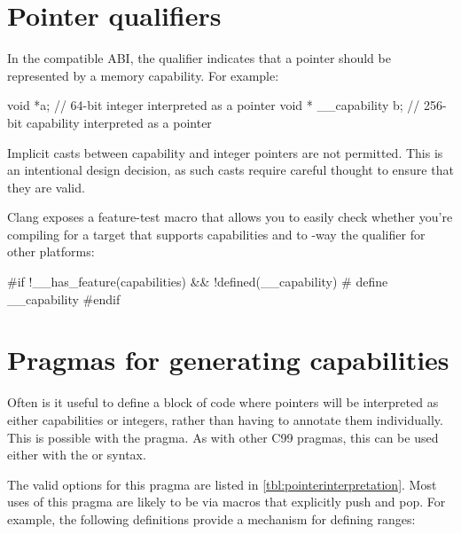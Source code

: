 \section{Pointer qualifiers}

In the compatible ABI, the  qualifier indicates that a pointer should be represented by a memory capability.
For example:

\begin{csnippet}
void *a; // 64-bit integer interpreted as a pointer
void * __capability b; // 256-bit capability interpreted as a pointer
\end{csnippet}

Implicit casts between capability and integer pointers are not permitted.
This is an intentional design decision, as such casts require careful thought to ensure that they are valid.

Clang exposes a feature-test macro that allows you to easily check whether you're compiling for a target that supports capabilities and to -way the  qualifier for other platforms:

\begin{csnippet}
	#if !__has_feature(capabilities) && !defined(__capability)
	#   define __capability
	#endif
\end{csnippet}


\section{Pragmas for generating capabilities}

Often is it useful to define a block of code where pointers will be interpreted as either capabilities or integers, rather than having to annotate them individually.
This is possible with the  pragma.
As with other C99 pragmas, this can be used either with the  or  syntax.

The valid options for this pragma are listed in \autoref{tbl:pointerinterpretation}.
Most uses of this pragma are likely to be via macros that explicitly push and pop.
For example, the following definitions provide a mechanism for defining ranges:

